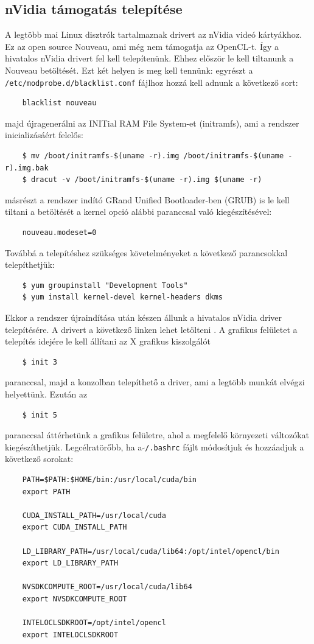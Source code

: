 \subsection*{nVidia támogatás telepítése}
	A legtöbb mai Linux disztrók tartalmaznak drivert az nVidia videó kártyákhoz.
	Ez az open source Nouveau, ami még nem támogatja az OpenCL-t.
	Így a hivatalos nVidia drivert fel kell telepítenünk.
	Ehhez először le kell tiltanunk a Nouveau betöltését.
	Ezt két helyen is meg kell tennünk: 
	egyrészt a \texttt{/etc/modprobe.d/blacklist.conf} fájlhoz hozzá kell adnunk a
	következő sort:
	\begin{lstlisting}
	blacklist nouveau
	\end{lstlisting}
	majd újragenerálni az INITial RAM File System-et (initramfs), ami a rendszer
	inicializásáért felelős:
	\begin{lstlisting}
	$ mv /boot/initramfs-$(uname -r).img /boot/initramfs-$(uname -r).img.bak
	$ dracut -v /boot/initramfs-$(uname -r).img $(uname -r)
	\end{lstlisting}
	másrészt a rendszer indító GRand Unified Bootloader-ben (GRUB) is le kell
	tiltani a betöltését a kernel opció alábbi paranccsal való kiegészítésével:
	\begin{lstlisting}
	nouveau.modeset=0
	\end{lstlisting}
	Továbbá a telepítéshez szükséges követelményeket a következő parancsokkal telepíthetjük:
	\begin{lstlisting}
	$ yum groupinstall "Development Tools"
	$ yum install kernel-devel kernel-headers dkms
	\end{lstlisting}
	Ekkor a rendszer újraindítása után készen állunk a hivatalos nVidia driver
	telepítésére. A drivert a következő linken lehet letölteni \cite{nvidia-driver}.
	A grafikus felületet a telepítés idejére le kell állítani az X grafikus
	kiszolgálót
	\begin{lstlisting}
	$ init 3
	\end{lstlisting}
	paranccsal, majd a konzolban telepíthető a driver, ami a legtöbb munkát elvégzi helyettünk. Ezután az
	\begin{lstlisting}
	$ init 5
	\end{lstlisting}
	paranccsal áttérhetünk a grafikus felületre, ahol a megfelelő környezeti változókat kiegészíthetjük.
	Legcélratörőbb, ha a \texttt{$\tilde{}$/.bashrc} fájlt módosítjuk és hozzáadjuk
	a következő sorokat:
	\begin{lstlisting}
	PATH=$PATH:$HOME/bin:/usr/local/cuda/bin
	export PATH
	
	CUDA_INSTALL_PATH=/usr/local/cuda
	export CUDA_INSTALL_PATH
	
	LD_LIBRARY_PATH=/usr/local/cuda/lib64:/opt/intel/opencl/bin
	export LD_LIBRARY_PATH
	
	NVSDKCOMPUTE_ROOT=/usr/local/cuda/lib64
	export NVSDKCOMPUTE_ROOT
	
	INTELOCLSDKROOT=/opt/intel/opencl
	export INTELOCLSDKROOT
	\end{lstlisting}
